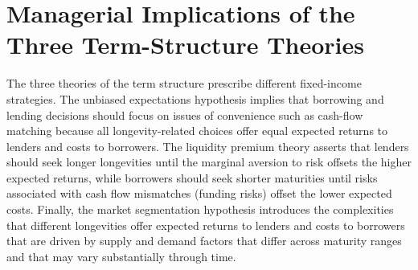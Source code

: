 \documentclass[11pt]{article}
\begin{document}
\section*{Managerial Implications of the Three Term-Structure Theories}
The three theories of the term structure prescribe different fixed-income strategies. The unbiased expectations hypothesis implies that borrowing and lending decisions should focus on issues of convenience such as cash-flow matching because all longevity-related choices offer equal expected returns to lenders and costs to borrowers. The liquidity premium theory asserts that lenders should seek longer longevities until the marginal aversion to risk offsets the higher expected returns, while borrowers should seek shorter maturities until risks associated with cash flow mismatches (funding risks) offset the lower expected costs. Finally, the market segmentation hypothesis introduces the complexities that different longevities offer expected returns to lenders and costs to borrowers that are driven by supply and demand factors that differ across maturity ranges and that may vary substantially through time.
\end{document}
